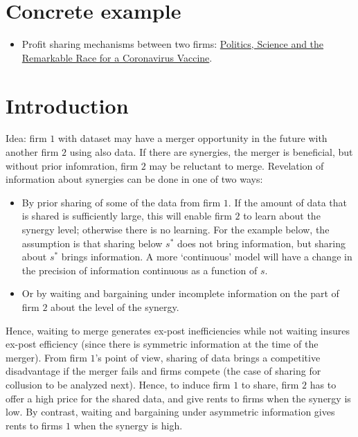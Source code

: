 \documentclass[a4paper]{article}
\begin{document}
\section{Concrete example}

\begin{itemize}
    \item Profit sharing mechanisms between two firms: \href{https://www.nytimes.com/2020/11/21/us/politics/coronavirus-vaccine.html?referringSource=articleShare}{Politics, Science and the Remarkable Race for a Coronavirus Vaccine}.
    
\end{itemize}





\section{Introduction}
Idea: firm $1$ with dataset may have a merger opportunity in the future with another firm $2$ using also data. If there are synergies, the merger is beneficial, but without prior infomration, firm $2$ may be reluctant to merge. Revelation of information about synergies can be done in one of two ways:
\begin{itemize}
  \item By prior sharing of some of the data from firm $1$. If the amount of data that is shared is sufficiently large, this will enable firm $2$ to learn about the synergy level; otherwise there is no learning. For the example below, the assumption is that sharing below $s^*$ does not bring information, but sharing about $s^*$ brings information. A more `continuous' model will have a change in the precision of information continuous as a function of $s$.
  \item Or by waiting and bargaining under incomplete information on the part of firm $2$ about the level of the synergy. 
\end{itemize}
Hence, waiting to merge generates ex-post inefficiencies while not waiting insures ex-post efficiency (since there is symmetric information at the time of the merger). From firm $1$'s point of view, sharing of data brings a competitive disadvantage if the merger fails and firms compete (the case of sharing for collusion to be analyzed next). Hence, to induce firm $1$ to share, firm $2$ has to offer a high price for the shared data, and give rents to firms when the synergy is low. By contrast, waiting and bargaining under asymmetric information gives rents to firms $1$ when the synergy is high.
\end{document}
